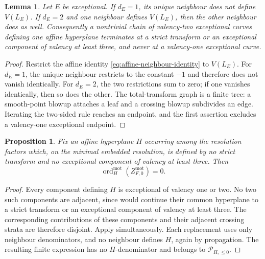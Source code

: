 \documentclass[12pt]{amsart}
\numberwithin{equation}{section}
\theoremstyle{plain}
\newtheorem{proposition}[theorem]{Proposition}
\newtheorem{lemma}[theorem]{Lemma}
\theoremstyle{definition}
\theoremstyle{remark}
\theoremstyle{definition}
\DeclareMathOperator{\ord}{ord}
\newcommand{\motzeta}{Z^{\mathrm{mot}}_{F,0}}
\begin{document}
\begin{lemma}\label{lem:motivic-hyperplane-propagation}
Let $E$ be exceptional. If $d_E=1$, its unique neighbour does not define $V(L_E)$. If $d_E=2$ and one neighbour defines $V(L_E)$, then the other neighbour does as well. Consequently a nontrivial chain of valency-two exceptional curves defining one affine hyperplane terminates at a strict transform or an exceptional component of valency at least three, and never at a valency-one exceptional curve.
\end{lemma}

\begin{proof}
Restrict the affine identity \eqref{eq:affine-neighbour-identity} to $V(L_E)$. For $d_E=1$, the unique neighbour restricts to the constant $-1$ and therefore does not vanish identically. For $d_E=2$, the two restrictions sum to zero; if one vanishes identically, then so does the other. The total-transform graph is a finite tree: a smooth-point blowup attaches a leaf and a crossing blowup subdivides an edge. Iterating the two-sided rule reaches an endpoint, and the first assertion excludes a valency-one exceptional endpoint.
\end{proof}

\begin{proposition}\label{prop:motivic-denominator-deletion}
Fix an affine hyperplane $H$ occurring among the resolution factors which, on the minimal embedded resolution, is defined by no strict transform and no exceptional component of valency at least three. Then
\begin{equation*}
\ord_H^{\mathrm{mot}}(\motzeta)=0.
\end{equation*}
\end{proposition}

\begin{proof}
Every component defining $H$ is exceptional of valency one or two. No two such components are adjacent, since  would continue their common hyperplane to a strict transform or an exceptional component of valency at least three. The corresponding contributions of these components and their adjacent crossing strata are therefore disjoint. Apply  simultaneously. Each replacement uses only neighbour denominators, and no neighbour defines $H$, again by propagation. The resulting finite expression has no $H$-denominator and belongs to $\mathscr P_{H,\le0}$.
\end{proof}
\end{document}
